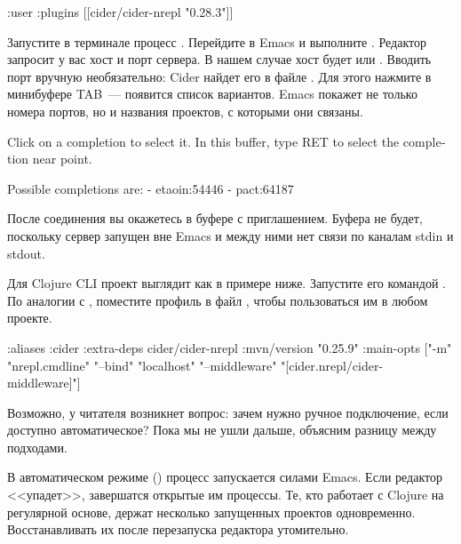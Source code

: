 \begin{english}
  \begin{clojure}
{:user
 {:plugins
  [[cider/cider-nrepl "0.28.3"]]}}
  \end{clojure}
\end{english}

Запустите в терминале процесс . Перейдите в Emacs и выполните . Редактор запросит у вас хост и порт сервера. В нашем случае хост будет  или . Вводить порт вручную необязательно: Cider найдет его в файле . Для этого нажмите в минибуфере TAB~--- появится список вариантов. Emacs покажет не только номера портов, но и названия проектов, с которыми они связаны.

\begin{english}
  \begin{text}
Click on a completion to select it.
In this buffer, type RET to select the completion
near point.

Possible completions are:
- etaoin:54446
- pact:64187
  \end{text}
\end{english}

После соединения вы окажетесь в буфере  с приглашением. Буфера  не будет, поскольку сервер запущен вне Emacs и между ними нет связи по каналам stdin и stdout.

Для Clojure CLI проект выглядит как в примере ниже. Запустите его командой . По аналогии с , поместите профиль  в файл , чтобы пользоваться им в любом проекте.

\begin{english}
  \begin{clojure}
{:aliases
 {:cider
  {:extra-deps
   {cider/cider-nrepl {:mvn/version "0.25.9"}}
   :main-opts
   ["-m" "nrepl.cmdline"
    "--bind" "localhost"
    "--middleware" "[cider.nrepl/cider-middleware]"]}}}
  \end{clojure}
\end{english}

Возможно, у читателя возникнет вопрос: зачем нужно ручное подключение, если доступно автоматическое? Пока мы не ушли дальше, объясним разницу между подходами.

В автоматическом режиме () процесс  запускается силами Emacs. Если редактор <<упадет>>, завершатся открытые им процессы. Те, кто работает с Clojure на регулярной основе, держат несколько запущенных проектов одновременно. Восстанавливать их после перезапуска редактора утомительно.

